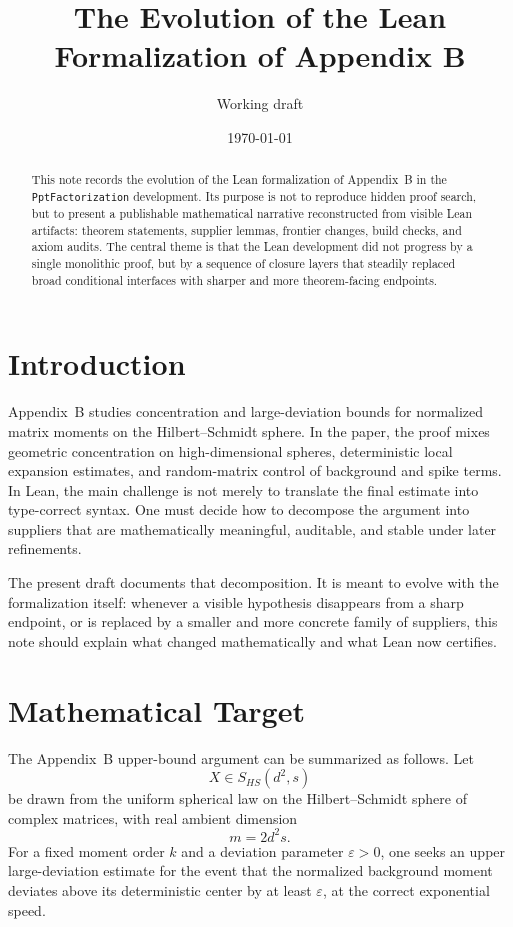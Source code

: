 \documentclass[11pt]{article}
\title{The Evolution of the Lean Formalization of Appendix B}
\author{Working draft}
\date{\today}
\begin{document}
\maketitle

\begin{abstract}
This note records the evolution of the Lean formalization of Appendix~B in the
\texttt{PptFactorization} development.  Its purpose is not to reproduce hidden
proof search, but to present a publishable mathematical narrative reconstructed
from visible Lean artifacts: theorem statements, supplier lemmas, frontier
changes, build checks, and axiom audits.  The central theme is that the Lean
development did not progress by a single monolithic proof, but by a sequence of
closure layers that steadily replaced broad conditional interfaces with sharper
and more theorem-facing endpoints.
\end{abstract}

\section{Introduction}

Appendix~B studies concentration and large-deviation bounds for normalized
matrix moments on the Hilbert--Schmidt sphere.  In the paper, the proof mixes
geometric concentration on high-dimensional spheres, deterministic local
expansion estimates, and random-matrix control of background and spike terms.
In Lean, the main challenge is not merely to translate the final estimate into
type-correct syntax.  One must decide how to decompose the argument into
suppliers that are mathematically meaningful, auditable, and stable under
later refinements.

The present draft documents that decomposition.  It is meant to evolve with the
formalization itself: whenever a visible hypothesis disappears from a sharp
endpoint, or is replaced by a smaller and more concrete family of suppliers,
this note should explain what changed mathematically and what Lean now certifies.

\section{Mathematical Target}

The Appendix~B upper-bound argument can be summarized as follows.  Let
\[
  X \in S_{HS}(d^2,s)
\]
be drawn from the uniform spherical law on the Hilbert--Schmidt sphere of
complex matrices, with real ambient dimension
\[
  m = 2 d^2 s.
\]
For a fixed moment order \(k\) and a deviation parameter \(\varepsilon>0\), one
seeks an upper large-deviation estimate for the event that the normalized
background moment deviates above its deterministic center by at least
\(\varepsilon\), at the correct exponential speed.
\end{document}
